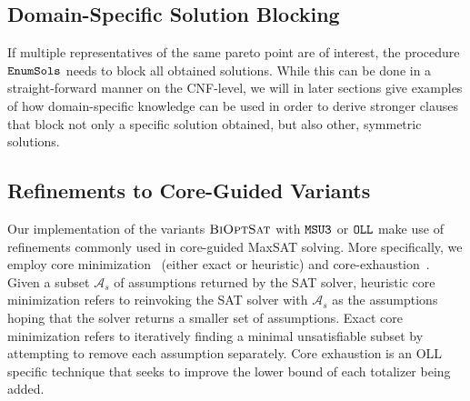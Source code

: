 \subsection{Domain-Specific Solution Blocking}

If multiple representatives of the same pareto point are of interest, the procedure $\texttt{EnumSols}$ needs to block all obtained solutions. 
While this can be done in a straight-forward manner on the CNF-level, we will in later sections give examples of how domain-specific knowledge can be used in order to derive stronger clauses 
that block not only a specific solution obtained, but also other, symmetric solutions.

\subsection{Refinements to Core-Guided Variants}

Our implementation of the variants $\textsc{BiOptSat}$ with $\texttt{MSU3}$ or $\texttt{OLL}$ make use of refinements commonly used in core-guided MaxSAT solving.
More specifically, we employ core minimization~\autocite{DBLP:journals/jsat/IgnatievMM19} (either exact or heuristic)
and core-exhaustion~\autocite{DBLP:journals/jsat/IgnatievMM19,DBLP:conf/cp/AnsoteguiBGL13}.
Given a subset $\mathcal{A}_s$ of assumptions returned by the SAT solver, heuristic core minimization refers to reinvoking the SAT solver with $\mathcal{A}_s$ as the assumptions hoping that the solver 
returns a smaller set of assumptions. Exact core minimization refers to iteratively finding a minimal unsatisfiable subset by attempting to remove each assumption separately.
Core exhaustion is an OLL specific technique that seeks to improve the lower bound of each totalizer being added.

